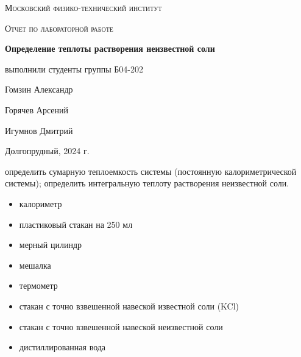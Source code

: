 \documentclass[a4paper]{article}
\begin{document}
\begin{titlepage}
	\centering
	\vspace{5cm}
	{\scshape\LARGE Московский физико-технический институт \par}
	\vspace{4cm}
	{\scshape\Large Отчет по лабораторной работе \par}
	\vspace{1cm}
	{\huge\bfseries Определение теплоты растворения неизвестной соли \par}
	\vspace{1cm}
	\vfill
\begin{flushright}
	{\large выполнили студенты группы Б04-202}\par
	\vspace{0.3cm}
	{\LARGE Гомзин Александр} \par
		\vspace{0.3cm}
	{\LARGE Горячев Арсений} \par
        \vspace{0.3cm}
        {\LARGE Игумнов Дмитрий} \par
\end{flushright}
	

	\vfill

	Долгопрудный, 2024 г.
\end{titlepage}

	\thispagestyle{empty}


	\newpage \LARGE
	
		\tableofcontents %
	
	\newpage
\par
	\large \textbf{} определить сумарную теплоемкость системы (постоянную калориметрической системы); определить интегральную теплоту растворения неизвестной соли.
	\par \vspace{0.3 cm}
	\textbf{}
        \begin{itemize}
           \item калориметр
           \item пластиковый стакан на 250 мл
           \item мерный цилиндр
           \item мешалка
           \item термометр
           \item стакан с точно взвешенной навеской известной соли (KCl)
           \item стакан с точно взвешенной навеской неизвестной соли
           \item дистиллированная вода
        \end{itemize}  
\vspace{0.3 cm}
\end{document}
